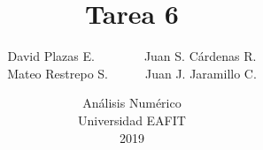\documentclass[10pt,letterpaper]{article}%
\title{\vspace{-1cm}Tarea 6}
\author{David Plazas E.$\qquad\qquad$Juan S. Cárdenas R.\\Mateo Restrepo S.$\qquad\quad$Juan J. Jaramillo C.}
\date{\vspace{-0.5cm}Análisis Numérico\\Universidad EAFIT\\2019}
\begin{document}
%


\nocite{*}
\begin{center}

\end{center}

\end{document}
